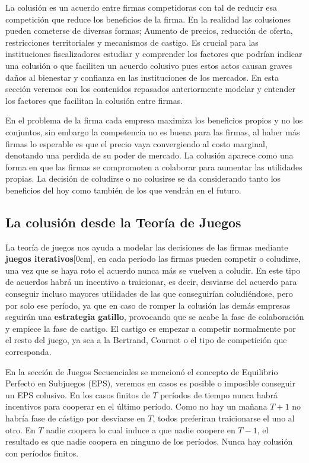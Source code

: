 La colusión es un acuerdo entre firmas competidoras con tal de reducir esa competición que reduce los beneficios de la firma. En la realidad las colusiones pueden cometerse de diversas formas; Aumento de precios, reducción de oferta, restricciones territoriales y mecanismos de castigo. Es crucial para las instituciones fiscalizadores estudiar y comprender los factores que podrían indicar una colusión o que faciliten un acuerdo colusivo pues estos actos causan graves daños al bienestar y confianza en las instituciones de los mercados. En esta sección veremos con los contenidos repasados anteriormente modelar y entender los factores que facilitan la colusión entre firmas. 

En el problema de la firma cada empresa maximiza los beneficios propios y no los conjuntos, sin embargo la competencia no es buena para las firmas, al haber más firmas lo esperable es que el precio vaya convergiendo al costo marginal, denotando una perdida de su poder de mercado. La colusión aparece como una forma en que las firmas se compromoten a colaborar para aumentar las utilidades propias. La decisión de coludirse o no colusirse se da considerando tanto los beneficios del hoy como también de los que vendrán en el futuro. 

\subsection{La colusión desde la Teoría de Juegos}

La teoría de juegos nos ayuda a modelar las decisiones de las firmas mediante \textbf{juegos iterativos}[0cm], en cada período las firmas pueden competir o coludirse, una vez que se haya roto el acuerdo nunca más se vuelven a coludir. En este tipo de acuerdos habrá un incentivo a traicionar, es decir, desviarse del acuerdo para conseguir incluso mayores utilidades de las que conseguirían coludiéndose, pero por solo ese período, ya que en caso de romper la colusión las demás empresas seguirán una \textbf{estrategia gatillo}, provocando que se acabe la fase de colaboración y empiece la fase de castigo. El castigo es empezar a competir normalmente por el resto del juego, ya sea a la Bertrand, Cournot o el tipo de competición que corresponda.

En la sección de Juegos Secuenciales se mencionó el concepto de Equilibrio Perfecto en Subjuegos (EPS), veremos en casos es posible o imposible conseguir un EPS colusivo. En los casos finitos de $T$ períodos de tiempo nunca habrá incentivos para cooperar en el último período. Como no hay un mañana $T+1$ no habría fase de cástigo por desviarse en $T$, todos preferiran traicionarse el uno al otro. En $T$ nadie coopera lo cual induce a que nadie coopere en $T-1$, el resultado es que nadie coopera en ninguno de los períodos. Nunca hay colusión con períodos finitos.

